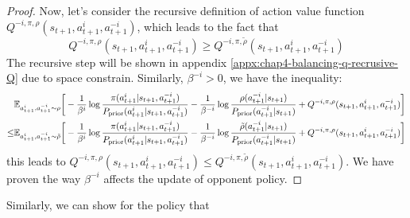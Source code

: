 \begin{proof}
Now, let's consider the  recursive definition of action value function $Q^{-i, \pi, \rho}(s_{t+1}, a^i_{t+1}, a^{-i}_{t+1})$, which leads to the fact that 
\begin{equation}
    Q^{-i, \pi, \rho}(s_{t+1}, a^i_{t+1}, a^{-i}_{t+1}) \ge Q^{-i, \pi, \tilde{\rho}}(s_{t+1}, a^i_{t+1}, a^{-i}_{t+1})
\end{equation}
The recursive step will be shown in appendix \ref{appx:chap4-balancing-q-recrusive-Q} due to space constrain. Similarly, $\beta^{-i} > 0$, we have the inequality:
\begin{equation*}
\begin{aligned}
    &\mathbb{E}_{a^i_{t+1}, a^{-i}_{t+1} \sim \rho}\bigg[-\frac{1}{\beta^i}\log \frac{\pi(a^i_{t+1} | s_{t+1}, a^{-i}_{t+1})}{P_{\text{prior}}(a^i_{t+1} | s_{t+1}, a^{-i}_{t+1})} - \frac{1}{\beta^{-i}}\log \frac{\rho(a^{-i}_{t+1} | s_{t+1})}{P_{\text{prior}}(a^{-i}_{t+1} | s_{t+1})} + Q^{-i, \pi, \rho}(s_{t+1}, a^i_{t+1}, a^{-i}_{t+1}) \bigg] \\
    \le &\mathbb{E}_{a^i_{t+1}, a^{-i}_{t+1} \sim \tilde{\rho}}\bigg[-\frac{1}{\beta^i}\log \frac{\pi(a^i_{t+1} | s_{t+1}, a^{-i}_{t+1})}{P_{\text{prior}}(a^i_{t+1} | s_{t+1}, a^{-i}_{t+1})} - \frac{1}{\beta^{-i}}\log \frac{\tilde{\rho}(a^{-i}_{t+1} | s_{t+1})}{P_{\text{prior}}(a^{-i}_{t+1} | s_{t+1})} + Q^{-i, \pi, \rho}(s_{t+1}, a^i_{t+1}, a^{-i}_{t+1}) \bigg]
\end{aligned}
\end{equation*}
this leads to $Q^{-i, \pi, \rho}(s_{t+1}, a^i_{t+1}, a^{-i}_{t+1}) \le Q^{-i, \pi, \tilde{\rho}}(s_{t+1}, a^i_{t+1}, a^{-i}_{t+1})$. We have proven the way $\beta^{-i}$ affects the update of opponent policy.
\end{proof}
Similarly, we can show for the policy that 
